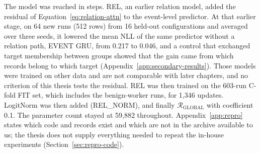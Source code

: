 The model was reached in steps. REL, an earlier relation model, added
the residual of Equation~\ref{eq:relation-attn} to the event-level
predictor. At that earlier stage, on 64 new runs (512 rows) from 16
held-out configurations and averaged over three seeds, it lowered the
mean NLL of the same predictor without a relation path, EVENT GRU,
from 0.217 to 0.046, and a control that exchanged target membership
between groups showed that the gain came from which records belong to
which target (Appendix~\ref{app:secondary-results}). Those models were
trained on other data and are not comparable with later chapters, and
no criterion of this thesis tests the residual. REL was then trained
on the 603-run C-fold FIT set, which includes the benign-worker runs,
for 1,346 updates. LogitNorm was then
added (REL\_NORM), and finally $\mathcal{R}_{\mathrm{GLOBAL}}$ with
coefficient 0.1. The parameter count stayed at 59,882 throughout.
Appendix~\ref{app:repro} states which code and records exist and which
are not in the archive available to us; the thesis does not supply
everything needed to repeat the in-house experiments
(Section~\ref{sec:repro-code}).

